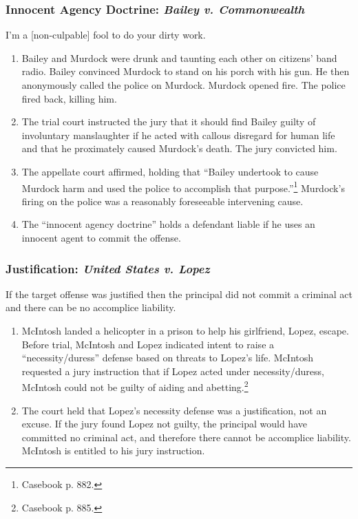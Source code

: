 \subsubsection{Innocent Agency Doctrine: \emph{Bailey v. Commonwealth}}

I'm a [non-culpable] fool to do your dirty work.

\begin{enumerate}
    \item Bailey and Murdock were drunk and taunting each other on citizens' 
    band radio. Bailey convinced Murdock to stand on his porch with his gun. 
    He then anonymously called the police on Murdock. Murdock opened fire. The 
    police fired back, killing him.
    \item The trial court instructed the jury that it should find Bailey 
    guilty of involuntary manslaughter if he acted with callous disregard for 
    human life and that he proximately caused Murdock's death. The jury 
    convicted him.
    \item The appellate court affirmed, holding that ``Bailey undertook to 
    cause Murdock harm and used the police to accomplish that 
    purpose.''\footnote{Casebook p. 882.} Murdock's firing on the police was a 
    reasonably foreseeable intervening cause.
    \item The ``innocent agency doctrine'' holds a defendant liable if he 
    uses an innocent agent to commit the offense.
\end{enumerate}

\subsubsection{Justification: \emph{United States v. Lopez}}

If the target offense was justified then the principal did not commit a 
criminal act and there can be no accomplice liability.

\begin{enumerate}
    \item McIntosh landed a helicopter in a prison to help his girlfriend, 
    Lopez, escape. Before trial, McIntosh and Lopez indicated intent to raise 
    a ``necessity/duress'' defense based on threats to Lopez's life. McIntosh 
    requested a jury instruction that if Lopez acted under necessity/duress, 
    McIntosh could not be guilty of aiding and abetting.\footnote{Casebook p. 
    885.}
    \item The court held that Lopez's necessity defense was a justification, 
    not an excuse. If the jury found Lopez not guilty, the principal would 
    have committed no criminal act, and therefore there cannot be accomplice 
    liability. McIntosh is entitled to his jury instruction.
\end{enumerate}

